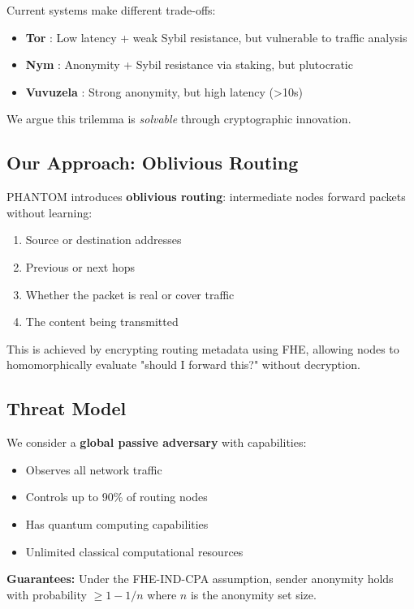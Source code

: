 \documentclass[11pt]{article}
\begin{document}
Current systems make different trade-offs:
\begin{itemize}
\item \textbf{Tor} \cite{tor}: Low latency + weak Sybil resistance, but vulnerable to traffic analysis
\item \textbf{Nym} \cite{nym}: Anonymity + Sybil resistance via staking, but plutocratic
\item \textbf{Vuvuzela} \cite{vuvuzela}: Strong anonymity, but high latency (>10s)
\end{itemize}

We argue this trilemma is \emph{solvable} through cryptographic innovation.

\subsection{Our Approach: Oblivious Routing}

PHANTOM introduces \textbf{oblivious routing}: intermediate nodes forward packets without learning:
\begin{enumerate}
\item Source or destination addresses
\item Previous or next hops
\item Whether the packet is real or cover traffic
\item The content being transmitted
\end{enumerate}

This is achieved by encrypting routing metadata using FHE, allowing nodes to homomorphically evaluate "should I forward this?" without decryption.

\subsection{Threat Model}

We consider a \textbf{global passive adversary} with capabilities:
\begin{itemize}
\item Observes all network traffic
\item Controls up to 90\% of routing nodes
\item Has quantum computing capabilities
\item Unlimited classical computational resources
\end{itemize}

\textbf{Guarantees:} Under the FHE-IND-CPA assumption, sender anonymity holds with probability $\geq 1 - 1/n$ where $n$ is the anonymity set size.
\end{document}
